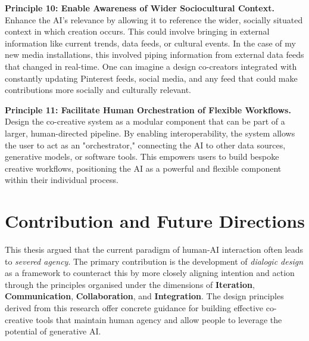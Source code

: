 \textbf{Principle 10: Enable Awareness of Wider Sociocultural Context.} Enhance the AI's relevance by allowing it to reference the wider, socially situated context in which creation occurs. This could involve bringing in external information like current trends, data feeds, or cultural events. In the case of my new media installations, this involved piping information from external data feeds that changed in real-time. One can imagine a design co-creators integrated with constantly updating Pinterest feeds, social media, and any feed that could make contributions more socially and culturally relevant. 

\textbf{Principle 11: Facilitate Human Orchestration of Flexible Workflows.} Design the co-creative system as a modular component that can be part of a larger, human-directed pipeline. By enabling interoperability, the system allows the user to act as an "orchestrator," connecting the AI to other data sources, generative models, or software tools. This empowers users to build bespoke creative workflows, positioning the AI as a powerful and flexible component within their individual process.

\section{Contribution and Future Directions}
This thesis argued that the current paradigm of human-AI interaction often leads to \textit{severed agency}. The primary contribution is the development of \textit{dialogic design} as a framework to counteract this by more closely aligning intention and action through the principles organised under the dimensions of \textbf{Iteration}, \textbf{Communication}, \textbf{Collaboration}, and \textbf{Integration}. The design principles derived from this research offer concrete guidance for building effective co-creative tools that maintain human agency and allow people to leverage the potential of generative AI.
